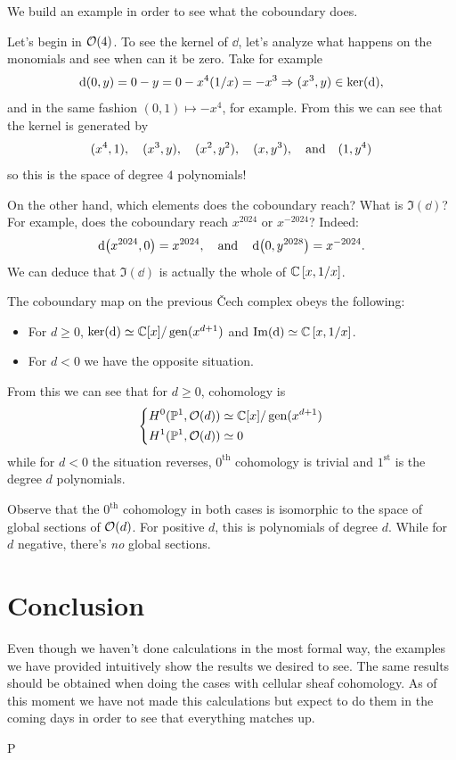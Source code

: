 \documentclass[12pt]{memoir}
\def\nextra {P}
\begin{document}
We build an example in order to see what the coboundary does. 

\begin{Ex}
Let's begin in $\mathcal{O}(4)$. To see the kernel of $\dd$, let's analyze what happens on the monomials and see when can it be zero. Take for example 
$$\dd(0,y)=0-y=0-x^4(1/x)=-x^3\Rightarrow (x^3,y)\in\ker(\dd),$$
and in the same fashion $(0,1)\mapsto -x^4$, for example. From this we can see that the kernel is generated by 
$$(x^4,1),\quad(x^3,y),\quad(x^2,y^2),\quad(x,y^3),\quad\text{and}\quad(1,y^4)$$
so this is the space of degree $4$ polynomials!\par
On the other hand, which elements does the coboundary reach? What is $\Im(\dd)$? For example, does the coboundary reach $x^{2024}$ or $x^{-2024}$? Indeed: 
$$\dd(x^{2024},0)=x^{2024},\quad\text{and}\quad\dd(0,y^{2028})=x^{-2024}.$$
We can deduce that $\Im(\dd)$ is actually the whole of $\mathbb{C}\left\lbrack x,1/x\right\rbrack$.
\end{Ex}

\begin{Prop}
The coboundary map on the previous \v{C}ech complex obeys the following:
\begin{itemize}
    \item For $d\geq 0$, $\ker(\dd)\simeq\mathbb{C}[x]/\operatorname{gen}(x^{d+1})$ and $\Im(\dd)\simeq\mathbb{C}\left\lbrack x,1/x\right\rbrack$.
    \item For $d<0$ we have the opposite situation.  
\end{itemize}
\end{Prop}

From this we can see that for $d\geq 0$, cohomology is 
$$\left\lbrace
\begin{aligned}
    &H^0(\mathbb{P}^1,\mathcal{O}(d))\simeq\mathbb{C}[x]/\operatorname{gen}(x^{d+1})\\
    &H^1(\mathbb{P}^1,\mathcal{O}(d))\simeq 0
\end{aligned}
\right.$$
while for $d<0$ the situation reverses, $0^{\text{th}}$ cohomology is trivial and $1^{\text{st}}$ is the degree $d$ polynomials.
\begin{Rmk}
    Observe that the $0^{\text{th}}$ cohomology in both cases is isomorphic to the space of global sections of $\mathcal{O}(d)$. For positive $d$, this is polynomials of degree $d$. While for $d$ negative, there's \emph{no} global sections.
\end{Rmk}

\section{Conclusion}

Even though we haven't done calculations in the most formal way, the examples we have provided intuitively show the results we desired to see. The same results should be obtained when doing the cases with cellular sheaf cohomology. As of this moment we have not made this calculations but expect to do them in the coming days in order to see that everything matches up. 


\ifx\nextra\undefined
\printindex
\else\fi
\nocite{*}


\end{document}
